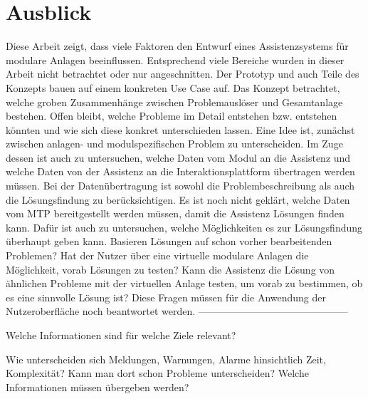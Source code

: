 \section*{Ausblick}
Diese Arbeit zeigt, dass viele Faktoren den Entwurf eines Assistenzsystems für modulare Anlagen beeinflussen. Entsprechend viele Bereiche wurden in dieser Arbeit nicht betrachtet oder nur angeschnitten. Der Prototyp und auch Teile des Konzepts bauen auf einem konkreten Use Case auf. Das Konzept betrachtet, welche groben Zusammenhänge zwischen Problemauslöser und Gesamtanlage bestehen. Offen bleibt, welche Probleme im Detail entstehen bzw. entstehen könnten und wie sich diese konkret unterschieden lassen. Eine Idee ist, zunächst zwischen anlagen- und modulspezifischen Problem zu unterscheiden. Im Zuge dessen ist auch zu untersuchen, welche Daten vom Modul an die Assistenz und welche Daten von der Assistenz an die Interaktionsplattform übertragen werden müssen. Bei der Datenübertragung ist sowohl die Problembeschreibung als auch die Lösungsfindung zu berücksichtigen. Es ist noch nicht geklärt, welche Daten vom MTP bereitgestellt werden müssen, damit die Assistenz Lösungen finden kann. Dafür ist auch zu untersuchen, welche Möglichkeiten es zur Lösungsfindung überhaupt geben kann. Basieren Lösungen auf schon vorher bearbeitenden Problemen? Hat der Nutzer über eine virtuelle modulare Anlagen die Möglichkeit, vorab Lösungen zu testen? Kann die Assistenz die Lösung von ähnlichen Probleme mit der virtuellen Anlage testen, um vorab zu bestimmen, ob es eine sinnvolle Lösung ist? Diese Fragen müssen für die Anwendung der Nutzeroberfläche noch beantwortet werden.
---------------------------------------------

Welche Informationen sind für welche Ziele relevant?

Wie unterscheiden sich Meldungen, Warnungen, Alarme hinsichtlich Zeit, Komplexität? Kann man dort schon Probleme unterscheiden? Welche Informationen müssen übergeben werden?


